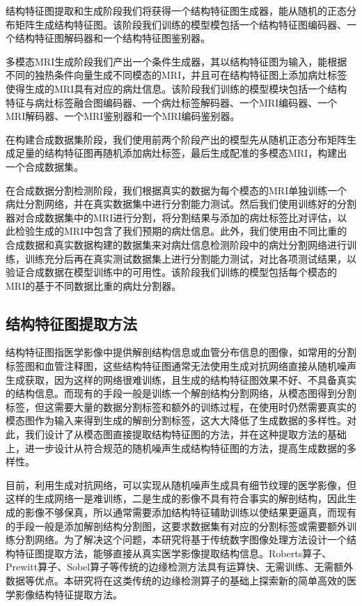 \documentclass[letterpaper]{article} %
\begin{document}
结构特征图提取和生成阶段我们将获得一个结构特征图生成器，能从随机的正态分布矩阵生成结构特征图。该阶段我们训练的模型模包括一个结构特征图编码器、一个结构特征图解码器和一个结构特征图鉴别器。

多模态MRI生成阶段我们产出一个条件生成器，其以结构特征图为输入，能根据不同的独热条件向量生成不同模态的MRI，并且可在结构特征图上添加病灶标签使得生成的MRI具有对应的病灶信息。该阶段我们训练的模型模块包括一个结构特征与病灶标签融合图编码器、一个病灶标签解码器、一个MRI编码器、一个MRI解码器、一个MRI鉴别器和一个MRI编码鉴别器。

在构建合成数据集阶段，我们使用前两个阶段产出的模型先从随机正态分布矩阵生成足量的结构特征图再随机添加病灶标签，最后生成配准的多模态MRI，构建出一个合成数据集。

在合成数据分割检测阶段，我们根据真实的数据为每个模态的MRI单独训练一个病灶分割网络，并在真实数据集中进行分割能力测试。然后我们使用训练好的分割器对合成数据集中的MRI进行分割，将分割结果与添加的病灶标签比对评估，以此检验生成的MRI中包含了我们预期的病灶信息。此外，我们使用由不同比重的合成数据和真实数据构建的数据集来对病灶信息检测阶段中的病灶分割网络进行训练，训练充分后再在真实测试数据集上进行分割能力测试，对比各项测试结果，以验证合成数据在模型训练中的可用性。该阶段我们训练的模型包括每个模态的MRI的基于不同数据比重的病灶分割器。

\subsection{结构特征图提取方法}
结构特征图指医学影像中提供解剖结构信息或血管分布信息的图像，如常用的分割标签图和血管注释图，这些结构特征图通常无法使用生成对抗网络直接从随机噪声生成获取，因为这样的网络很难训练，且生成的结构特征图效果不好、不具备真实的结构信息。而现有的手段一般是训练一个解剖结构分割网络，从模态图得到分割标签，但这需要大量的数据分割标签和额外的训练过程，在使用时仍然需要真实的模态图作为输入来得到生成的解剖分割标签，这大大降低了生成数据的多样性。对此，我们设计了从模态图直接提取结构特征图的方法，并在这种提取方法的基础上，进一步设计从符合规范的随机噪声生成结构特征图的方法，提高生成数据的多样性。

目前，利用生成对抗网络，可以实现从随机噪声生成具有细节纹理的医学影像，但这样的生成网络一是难训练，二是生成的影像不具有符合事实的解剖结构，因此生成的影像不够保真，所以通常需要添加结构特征辅助训练以使结果更逼真，而现有的手段一般是添加解剖结构分割图，这要求数据集有对应的分割标签或需要额外训练分割网络。为了解决这个问题，本研究将基于传统数字图像处理方法设计一个结构特征图提取方法，能够直接从真实医学影像提取结构信息。Roberts算子、Prewitt算子、Sobel算子等传统的边缘检测方法具有运算快、无需训练、无需额外数据等优点。本研究将在这类传统的边缘检测算子的基础上探索新的简单高效的医学影像结构特征提取方法。
\end{document}
